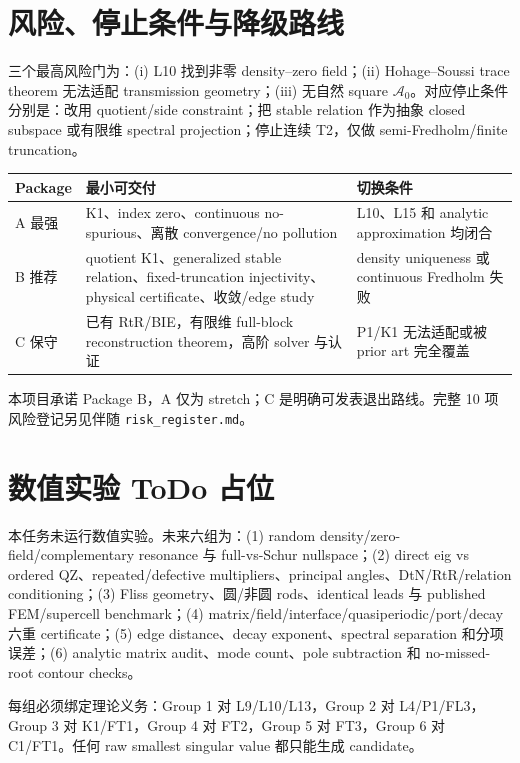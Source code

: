 \documentclass[UTF8,11pt,fontset=none]{ctexart}
\theoremstyle{definition}
\begin{document}
\section{风险、停止条件与降级路线}

三个最高风险门为：(i) L10 找到非零 density--zero field；(ii) Hohage--Soussi trace theorem 无法适配 transmission geometry；(iii) 无自然 square $\mathcal A_0$。对应停止条件分别是：改用 quotient/side constraint；把 stable relation 作为抽象 closed subspace 或有限维 spectral projection；停止连续 T2，仅做 semi-Fredholm/finite truncation。

\begin{table}[htbp]
\centering\small
\begin{tabularx}{\textwidth}{p{}YY}
\toprule
Package & 最小可交付 & 切换条件 \\
\midrule
A 最强 & K1、index zero、continuous no-spurious、离散 convergence/no pollution & L10、L15 和 analytic approximation 均闭合 \\
B 推荐 & quotient K1、generalized stable relation、fixed-truncation injectivity、physical certificate、收敛/edge study & density uniqueness 或 continuous Fredholm 失败 \\
C 保守 & 已有 RtR/BIE，有限维 full-block reconstruction theorem，高阶 solver 与认证 & P1/K1 无法适配或被 prior art 完全覆盖 \\
\bottomrule
\end{tabularx}
\end{table}

本项目承诺 Package B，A 仅为 stretch；C 是明确可发表退出路线。完整 10 项风险登记另见伴随 \texttt{risk\_register.md}。

\section{数值实验 ToDo 占位}

本任务未运行数值实验。未来六组为：(1) random density/zero-field/complementary resonance 与 full-vs-Schur nullspace；(2) direct eig vs ordered QZ、repeated/defective multipliers、principal angles、DtN/RtR/relation conditioning；(3) Fliss geometry、圆/非圆 rods、identical leads 与 published FEM/supercell benchmark；(4) matrix/field/interface/quasiperiodic/port/decay 六重 certificate；(5) edge distance、decay exponent、spectral separation 和分项误差；(6) analytic matrix audit、mode count、pole subtraction 和 no-missed-root contour checks。

每组必须绑定理论义务：Group 1 对 L9/L10/L13，Group 2 对 L4/P1/FL3，Group 3 对 K1/FT1，Group 4 对 FT2，Group 5 对 FT3，Group 6 对 C1/FT1。任何 raw smallest singular value 都只能生成 candidate。
\end{document}
